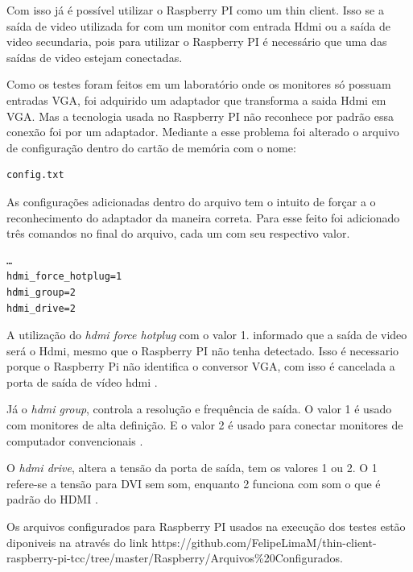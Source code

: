 \documentclass[
	12pt,				%
	openright,			%
	twoside,			%
	a4paper,			%
	chapter=TITLE,		%
	english,			%
	brazil				%
	]{abntex2}
\begin{document}
Com isso já é possível utilizar o Raspberry PI como um thin client. Isso se a saída de video utilizada for com um monitor com entrada Hdmi ou a saída de video secundaria, pois para utilizar o Raspberry PI é necessário que uma das saídas de  video estejam conectadas.

Como os testes foram feitos em um laboratório onde os monitores só possuam entradas VGA, foi adquirido um adaptador que transforma a saida Hdmi em VGA. Mas a tecnologia usada no  Raspberry PI não reconhece por padrão essa conexão foi por um adaptador. Mediante a esse problema foi alterado o arquivo de configuração dentro do cartão de memória com o nome:

\begin{verbatim}
config.txt
\end{verbatim}

As configurações adicionadas dentro do arquivo tem o intuito de forçar a o reconhecimento do adaptador da maneira correta. Para esse feito foi adicionado três comandos no final do arquivo, cada um com seu respectivo valor. 

\begin{verbatim}
…
hdmi_force_hotplug=1
hdmi_group=2
hdmi_drive=2
\end{verbatim}

A utilização do \textit{hdmi force hotplug} com o valor 1. informado que a saída de video será o Hdmi, mesmo que o Raspberry PI não tenha detectado. Isso é necessario porque o Raspberry Pi não identifica o conversor VGA, com isso é cancelada a porta de saída de vídeo hdmi \cite{vga}.  

Já o \textit{hdmi group}, controla a resolução e frequência de saída. O valor 1 é usado com monitores de alta definição. E o valor 2 é usado para  conectar monitores de computador convencionais \cite{vga}. 

O \textit{hdmi drive}, altera a tensão da porta de saída, tem os valores 1 ou 2. O 1 refere-se a tensão para DVI sem som, enquanto 2 funciona com som o que é padrão do HDMI \cite{vga}. 

Os arquivos configurados para Raspberry PI usados na execução dos testes estão diponiveis na através do link https://github.com/FelipeLimaM/thin-client-raspberry-pi-tcc/tree/master/Raspberry/Arquivos\%20Configurados. 

\end{document}
